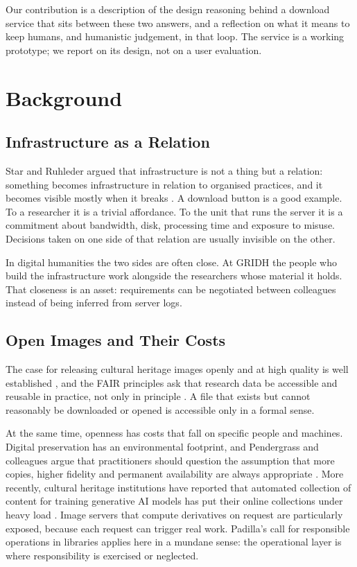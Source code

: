 \documentclass{dhnbpub}
\begin{document}
Our contribution is a description of the design reasoning behind a
download service that sits between these two answers, and a reflection
on what it means to keep humans, and humanistic judgement, in that
loop. The service is a working prototype; we report on its design, not
on a user evaluation.

\section{Background}

\subsection{Infrastructure as a Relation}

Star and Ruhleder argued that infrastructure is not a thing but a
relation: something becomes infrastructure in relation to organised
practices, and it becomes visible mostly when it breaks
\citep{star1996, star1999}. A download button is a good example. To a
researcher it is a trivial affordance. To the unit that runs the server
it is a commitment about bandwidth, disk, processing time and exposure
to misuse. Decisions taken on one side of that relation are usually
invisible on the other.

In digital humanities the two sides are often close. At GRIDH the
people who build the infrastructure work alongside the researchers
whose material it holds. That closeness is an asset: requirements can
be negotiated between colleagues instead of being inferred from server
logs.

\subsection{Open Images and Their Costs}

The case for releasing cultural heritage images openly and at high
quality is well established \citep{terras2015}, and the FAIR principles
ask that research data be accessible and reusable in practice, not only
in principle \citep{wilkinson2016}. A file that exists but cannot
reasonably be downloaded or opened is accessible only in a formal
sense.

At the same time, openness has costs that fall on specific people and
machines. Digital preservation has an environmental footprint, and
Pendergrass and colleagues argue that practitioners should question the
assumption that more copies, higher fidelity and permanent availability
are always appropriate \citep{pendergrass2019}. More recently, cultural
heritage institutions have reported that automated collection of
content for training generative AI models has put their online
collections under heavy load \citep{weinberg2025}. Image servers that
compute derivatives on request are particularly exposed, because each
request can trigger real work. Padilla's call for responsible
operations in libraries \citep{padilla2019} applies here in a mundane
sense: the operational layer is where responsibility is exercised or
neglected.
\end{document}
